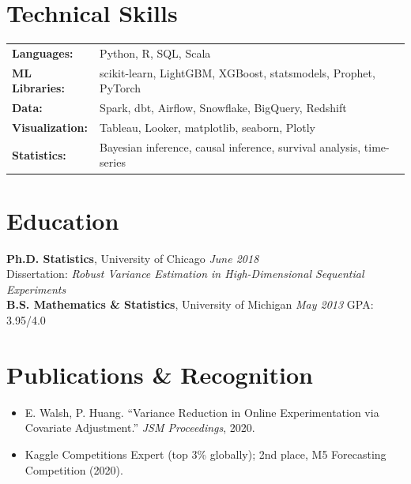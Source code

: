 \documentclass[11pt,a4paper]{article}
\begin{document}
\section{Technical Skills}
\begin{tabular}{@{}ll}
\textbf{Languages:}        & Python, R, SQL, Scala \\
\textbf{ML Libraries:}     & scikit-learn, LightGBM, XGBoost, statsmodels, Prophet, PyTorch \\
\textbf{Data:}             & Spark, dbt, Airflow, Snowflake, BigQuery, Redshift \\
\textbf{Visualization:}    & Tableau, Looker, matplotlib, seaborn, Plotly \\
\textbf{Statistics:}       & Bayesian inference, causal inference, survival analysis, time-series \\
\end{tabular}

\section{Education}
\textbf{Ph.D. Statistics}, University of Chicago \hfill \textit{June 2018}\\
Dissertation: \textit{Robust Variance Estimation in High-Dimensional Sequential Experiments}\\[3pt]
\textbf{B.S. Mathematics \& Statistics}, University of Michigan \hfill \textit{May 2013} \quad GPA: 3.95/4.0

\section{Publications \& Recognition}
\begin{itemize}
  \item E. Walsh, P. Huang. ``Variance Reduction in Online Experimentation via Covariate Adjustment.'' \textit{JSM Proceedings}, 2020.
  \item Kaggle Competitions Expert (top 3\% globally); 2nd place, M5 Forecasting Competition (2020).
\end{itemize}
\end{document}
